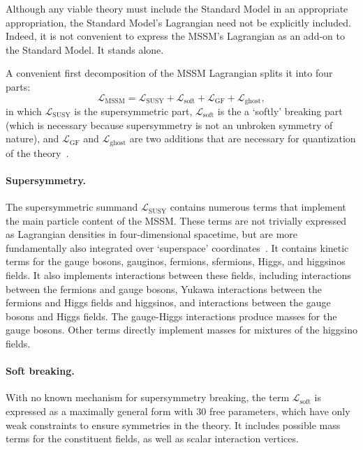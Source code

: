 Although any viable theory must include the Standard Model in an appropriate
appropriation, the Standard Model's Lagrangian need not be explicitly included.
Indeed, it is not convenient to express the MSSM's Lagrangian as an add-on to
the Standard Model. It stands alone.

A convenient first decomposition of the MSSM Lagrangian splits it into four
parts:
\begin{equation}
\mathcal{L}_\mathrm{MSSM} =
\mathcal{L}_\mathrm{SUSY}
+ \mathcal{L}_\mathrm{soft}
+ \mathcal{L}_\mathrm{GF}
+ \mathcal{L}_\mathrm{ghost}
,
\end{equation}
in which
$\mathcal{L}_\mathrm{SUSY}$ is the supersymmetric part,
$\mathcal{L}_\mathrm{soft}$ is the a `softly' breaking part
(which is necessary because supersymmetry is not an unbroken symmetry of
nature),
and
$\mathcal{L}_\mathrm{GF}$ and $\mathcal{L}_\mathrm{ghost}$
are two additions that are necessary for quantization of the
theory~\cite{kuroda1999complete}.

\paragraph{Supersymmetry.}
The supersymmetric summand $\mathcal{L}_\mathrm{SUSY}$ contains numerous terms
that implement the main particle content of the MSSM.
These terms are not trivially expressed as Lagrangian densities in
four-dimensional spacetime, but are more fundamentally also integrated over
`superspace' coordinates~\cite{martin2016primer, kuroda1999complete}.
It contains kinetic terms for the gauge bosons, gauginos, fermions, sfermions,
Higgs, and higgsinos fields.
It also implements interactions between these fields,
including interactions between the fermions and gauge bosons,
Yukawa interactions between the fermions and Higgs fields and higgsinos,
and interactions between the gauge bosons and Higgs fields.
The gauge-Higgs interactions produce masses for the gauge bosons.
Other terms directly implement masses for mixtures of the higgsino fields.

\paragraph{Soft breaking.}
With no known mechanism for supersymmetry breaking,
the term $\mathcal{L}_\mathrm{soft}$ is expressed as a maximally general form
with $30$ free parameters, which have only weak constraints to ensure
symmetries in the theory.
It includes possible mass terms for the constituent fields, as well as scalar
interaction vertices.

